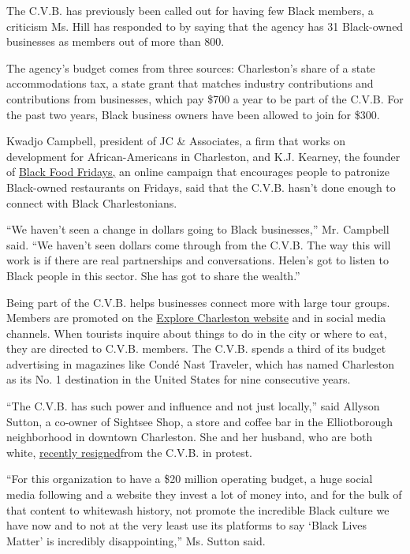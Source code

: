 The C.V.B. has previously been called out for having few Black members,
a criticism Ms. Hill has responded to by saying that the agency has 31
Black-owned businesses as members out of more than 800.

The agency's budget comes from three sources: Charleston's share of a
state accommodations tax, a state grant that matches industry
contributions and contributions from businesses, which pay \$700 a year
to be part of the C.V.B. For the past two years, Black business owners
have been allowed to join for \$300.

Kwadjo Campbell, president of JC \& Associates, a firm that works on
development for African-Americans in Charleston, and K.J. Kearney, the
founder of \href{https://www.blackfoodfridays.com/}{Black Food Fridays,}
an online campaign that encourages people to patronize Black-owned
restaurants on Fridays, said that the C.V.B. hasn't done enough to
connect with Black Charlestonians.

``We haven't seen a change in dollars going to Black businesses,'' Mr.
Campbell said. ``We haven't seen dollars come through from the C.V.B.
The way this will work is if there are real partnerships and
conversations. Helen's got to listen to Black people in this sector. She
has got to share the wealth.''

Being part of the C.V.B. helps businesses connect more with large tour
groups. Members are promoted on the
\href{https://www.charlestoncvb.com/}{Explore Charleston website} and in
social media channels. When tourists inquire about things to do in the
city or where to eat, they are directed to C.V.B. members. The C.V.B.
spends a third of its budget advertising in magazines like Condé Nast
Traveler, which has named Charleston as its No. 1 destination in the
United States for nine consecutive years.

``The C.V.B. has such power and influence and not just locally,'' said
Allyson Sutton, a co-owner of Sightsee Shop, a store and coffee bar in
the Elliotborough neighborhood in downtown Charleston. She and her
husband, who are both white,
\href{https://www.charlestoncitypaper.com/charleston/why-our-business-resigned-from-the-charleston-visitors-bureau/Content?oid=31714396}{recently
resigned}from the C.V.B. in protest.

``For this organization to have a \$20 million operating budget, a huge
social media following and a website they invest a lot of money into,
and for the bulk of that content to whitewash history, not promote the
incredible Black culture we have now and to not at the very least use
its platforms to say `Black Lives Matter' is incredibly disappointing,''
Ms. Sutton said.

